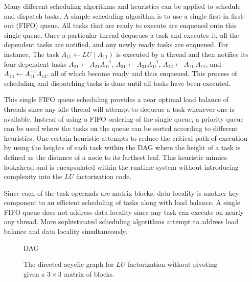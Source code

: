 Many different scheduling algorithms and heuristics can be applied to
schedule and dispatch tasks.
A simple scheduling algorithm is to use a single first-in first-out
(FIFO) queue.
All tasks that are ready to execute are enqueued onto this single
queue.
Once a particular thread dequeues a task and executes it, all the
dependent tasks are notified, and any newly ready tasks are enqueued.
For instance,
The task $A_{11} \leftarrow LU( A_{11} )$ is executed by a thread and
then notifies its four dependent tasks
$A_{21} \leftarrow A_{21} A_{11}^{-1}$,
$A_{31} \leftarrow A_{31} A_{11}^{-1}$,
$A_{12} \leftarrow A_{11}^{-1} A_{12}$, and
$A_{13} \leftarrow A_{11}^{-1} A_{13}$,
all of which become ready and thus enqueued.
This process of scheduling and dispatching tasks is done until all
tasks have been executed.

This single FIFO queue scheduling provides a near optimal load balance
of threads since any idle thread will attempt to dequeue a task
whenever one is available.
Instead of using a FIFO ordering of the single queue, a priority queue
can be used where the tasks on the queue can be sorted according to
different heuristics.
One certain heuristic attempts to reduce the critical path of
execution by using the heights of each task within the \ac{DAG} where the
height of a task is defined as the distance of a node to its farthest
leaf.  %
This heuristic mimics lookahead and is encapsulated within the runtime
system without introducing complexity into the $LU$ factorization
code.

Since each of the task operands are matrix blocks, data locality is
another key component to an efficient scheduling of tasks along with
load balance.
A single FIFO queue does not address data locality since any task can
execute on nearly any thread.
More sophisticated scheduling algorithms attempt to address load
balance and data locality simultaneously.

\begin{figure}
\begin{center}
DAG
\end{center}
\caption{The directed acyclic graph for $LU$ factorization without
  pivoting given a $3 \times 3$ matrix of blocks.}
\label{fig:dag}
\end{figure}
